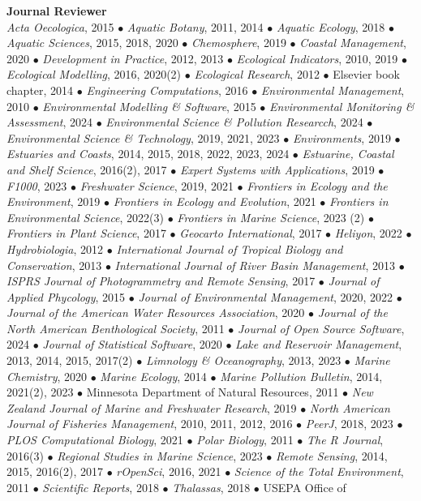 \documentclass[letterpaper,12pt]{article}
\begin{document}
{\bf Journal Reviewer}\hfill \\
\textit{Acta Oecologica}, 2015 $\bullet$ \textit{Aquatic Botany}, 2011, 2014 $\bullet$ \textit{Aquatic Ecology}, 2018 $\bullet$ \textit{Aquatic Sciences}, 2015, 2018, 2020 $\bullet$ \textit{Chemosphere}, 2019 $\bullet$ \textit{Coastal Management}, 2020 $\bullet$ \textit{Development in Practice}, 2012, 2013 $\bullet$ \textit{Ecological Indicators}, 2010, 2019 $\bullet$ \textit{Ecological Modelling}, 2016, 2020(2) $\bullet$ \textit{Ecological Research}, 2012 $\bullet$ Elsevier book chapter, 2014 $\bullet$ \textit{Engineering Computations}, 2016 $\bullet$ \textit{Environmental Management}, 2010 $\bullet$ \textit{Environmental Modelling \& Software}, 2015 $\bullet$ \textit{Environmental Monitoring \& Assessment}, 2024 $\bullet$ \textit{Environmental Science \& Pollution Researcch}, 2024 $\bullet$ \textit{Environmental Science \& Technology}, 2019, 2021, 2023 $\bullet$ \textit{Environments}, 2019 $\bullet$ \textit{Estuaries and Coasts}, 2014, 2015, 2018, 2022, 2023, 2024 $\bullet$ \textit{Estuarine, Coastal and Shelf Science}, 2016(2), 2017 $\bullet$ \textit{Expert Systems with Applications}, 2019 $\bullet$ \textit{F1000}, 2023 $\bullet$ \textit{Freshwater Science}, 2019, 2021 $\bullet$ \textit{Frontiers in Ecology and the Environment}, 2019 $\bullet$ \textit{Frontiers in Ecology and Evolution}, 2021 $\bullet$ \textit{Frontiers in Environmental Science}, 2022(3) $\bullet$ \textit{Frontiers in Marine Science}, 2023 (2) $\bullet$ \textit{Frontiers in Plant Science}, 2017 $\bullet$ \textit{Geocarto International}, 2017 $\bullet$ \textit{Heliyon}, 2022 $\bullet$ \textit{Hydrobiologia}, 2012 $\bullet$ \textit{International Journal of Tropical Biology and Conservation}, 2013 $\bullet$ \textit{International Journal of River Basin Management}, 2013 $\bullet$ \textit{ISPRS Journal of Photogrammetry and Remote Sensing}, 2017 $\bullet$ \textit{Journal of Applied Phycology}, 2015 $\bullet$ \textit{Journal of Environmental Management}, 2020, 2022 $\bullet$ \textit{Journal of the American Water Resources Association}, 2020 $\bullet$ \textit{Journal of the North American Benthological Society}, 2011 $\bullet$ \textit{Journal of Open Source Software}, 2024 $\bullet$ \textit{Journal of Statistical Software}, 2020 $\bullet$ \textit{Lake and Reservoir Management}, 2013, 2014, 2015, 2017(2) $\bullet$ \textit{Limnology \& Oceanography}, 2013, 2023 $\bullet$ \textit{Marine Chemistry}, 2020 $\bullet$ \textit{Marine Ecology}, 2014 $\bullet$ \textit{Marine Pollution Bulletin}, 2014, 2021(2), 2023 $\bullet$ Minnesota Department of Natural Resources, 2011 $\bullet$ \textit{New Zealand Journal of Marine and Freshwater Research}, 2019 $\bullet$ \textit{North American Journal of Fisheries Management}, 2010, 2011, 2012, 2016 $\bullet$ \textit{PeerJ}, 2018, 2023 $\bullet$ \textit{PLOS Computational Biology}, 2021 $\bullet$ \textit{Polar Biology}, 2011 $\bullet$ \textit{The R Journal}, 2016(3) $\bullet$ \textit{Regional Studies in Marine Science}, 2023 $\bullet$ \textit{Remote Sensing}, 2014, 2015, 2016(2), 2017 $\bullet$ \textit{rOpenSci}, 2016, 2021 $\bullet$ \textit{Science of the Total Environment}, 2011 $\bullet$ \textit{Scientific Reports}, 2018 $\bullet$ \textit{Thalassas}, 2018 $\bullet$ USEPA Office of 
\end{document}
